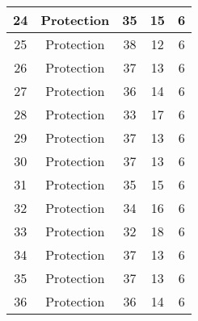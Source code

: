 \documentclass[results.tex]{subfiles}
\begin{document}
\begin{center}
\begin{tabular}{| c || c | c | c | c |}
            \hline
            24                      & Protection                   & 35                     & 15                      & 6                    \\
            \hline
            25                      & Protection                   & 38                     & 12                      & 6                    \\
            \hline
            26                      & Protection                   & 37                     & 13                      & 6                    \\
            \hline
            27                      & Protection                   & 36                     & 14                      & 6                    \\
            \hline
            28                      & Protection                   & 33                     & 17                      & 6                    \\
            \hline
            29                      & Protection                   & 37                     & 13                      & 6                    \\
            \hline
            30                      & Protection                   & 37                     & 13                      & 6                    \\
            \hline
            31                      & Protection                   & 35                     & 15                      & 6                    \\
            \hline
            32                      & Protection                   & 34                     & 16                      & 6                    \\
            \hline
            33                      & Protection                   & 32                     & 18                      & 6                    \\
            \hline
            34                      & Protection                   & 37                     & 13                      & 6                    \\
            \hline
            35                      & Protection                   & 37                     & 13                      & 6                    \\
            \hline
            36                      & Protection                   & 36                     & 14                      & 6                    \\

\end{tabular}
\end{center}
\end{document}
